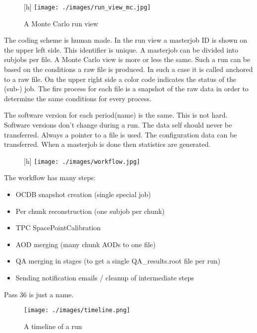 \begin{figure}
  \begin{center}[h]
    \texttt{[image: ./images/run\_view\_mc.jpg]}
    \caption{A Monte Carlo run view}
    \label{fig:run_view_mc}
  \end{center}
\end{figure}

The coding scheme is human made. In the run view a masterjob ID is shown on the upper left side. This identifier is unique. A masterjob can be divided into subjobs per file. A Monte Carlo view is more or less the same. Such a run can be based on the conditions a raw file is produced. In such a case it is called anchored to a raw file. On the upper right side a color code indicates the status of the (sub-) job. The firs process for each file is a snapshot of the raw data in order to determine the same conditions for every process.

The software version for each period(name) is the same. This is not hard. Software versions don't change during a run. The data self should never be transferred. Always a pointer to a file is used. The configuration data can be transferred. When a masterjob is done then statistics are generated. 

\begin{figure}
  \begin{center}[h]
    \texttt{[image: ./images/workflow.jpg]}
    \caption{}
    \label{fig:}
  \end{center}
\end{figure}

The workflow has many steps:
\begin{itemize}
  \item OCDB snapshot creation (single special job)
  \item Per chunk reconstruction (one subjob per chunk)
  \item TPC SpacePointCalibration
  \item AOD merging (many chunk AODs to one file)
  \item QA merging in stages (to get a single QA\_results.root file per run)
  \item Sending notification emails / cleanup of intermediate steps
\end{itemize}

Pass 36 is just a name. 

\begin{figure}[h]
  \begin{center}
    \texttt{[image: ./images/timeline.png]}
    \caption{A timeline of a run}
    \label{fig:timeline}
  \end{center}
\end{figure}


